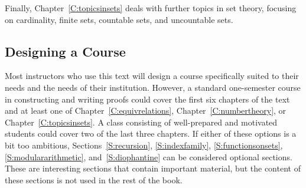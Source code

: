 Finally, Chapter~\ref{C:topicsinsets} deals with further topics in set theory, focusing on cardinality, finite sets, countable sets, and uncountable sets.

\subsection*{Designing a Course}
Most instructors who use this text will design a course specifically suited to their needs and the needs of their institution.  However, a standard one-semester course in constructing and writing proofs could cover the first six chapters of the text and at least one of Chapter~\ref{C:equivrelations}, Chapter~\ref{C:numbertheory}, or Chapter~\ref{C:topicsinsets}.  A class consisting of well-prepared and motivated students could cover two of the last three chapters.  If either of these options is a bit too ambitious, Sections~\ref{S:recursion}, \ref{S:indexfamily}, \ref{S:functionsonsets}, \ref{S:modulararithmetic}, 
and~\ref{S:diophantine} can be considered optional sections.  These are interesting sections that contain important material, but the content of these sections is not used in the rest of the book.  

%
%


